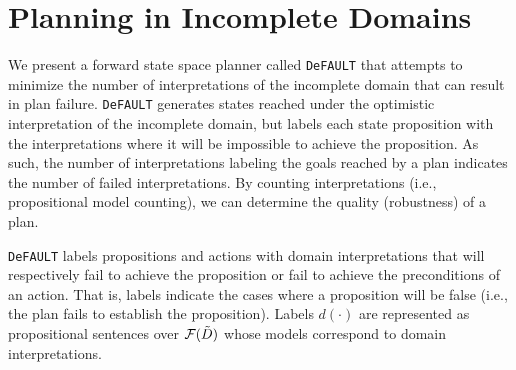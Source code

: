 \documentclass{article}
\def\und#1{\noindent{\bf #1}:}
\def\FFRISKY{{\tt DeFAULT}}
\def\und#1{\medskip{\noindent\bf #1:}}
\begin{document}
%
%
%

\section{Planning in Incomplete Domains}

We present a forward state space planner called \FFRISKY{} that attempts to minimize the number of interpretations of the incomplete domain that can result in plan failure.  \FFRISKY{} generates states reached under the optimistic interpretation of the incomplete domain, but labels each state proposition with the interpretations where it will be impossible to achieve the proposition.  As such, the number of interpretations labeling the goals reached by a plan indicates the number of failed interpretations.  By counting interpretations (i.e., propositional model counting), we can determine the quality (robustness) of a plan.

\FFRISKY{} labels propositions and actions with domain interpretations that will respectively fail to achieve the proposition or fail to achieve the preconditions of an action.  That is, labels indicate the cases where a proposition will be false (i.e., the plan fails to establish the proposition).  Labels $d(\cdot)$ are represented as  propositional sentences over ${\cal F}(\tilde{D})$ whose models correspond to domain interpretations.  
\end{document}
